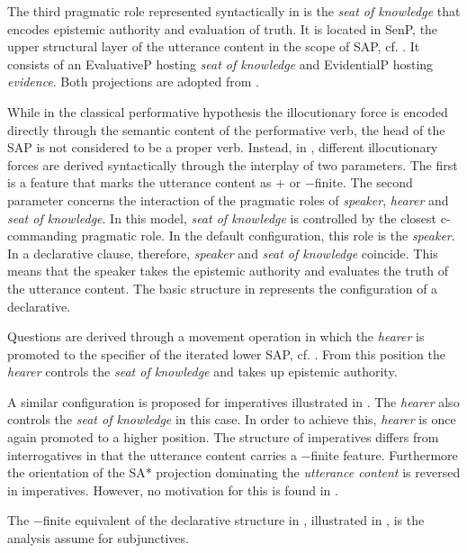 The third pragmatic role represented syntactically in \citet{SpeasTenny2003} is the \emph{seat of knowledge} that encodes epistemic authority and evaluation of truth. It is located in
SenP, the upper structural layer of the utterance content in the scope of
SAP, cf. . It consists of an EvaluativeP hosting \emph{seat of knowledge} and EvidentialP
hosting \emph{evidence}. Both projections are adopted from \citet{Cinque1990}.

While in the classical performative hypothesis the illocutionary force is encoded directly
through the semantic content of the performative verb, the head of the SAP is not
 considered to be a proper verb. Instead, in \citet{SpeasTenny2003}, different illocutionary forces are derived syntactically through the interplay of two parameters. The first is a feature that marks
the utterance content as + or −finite. The second parameter concerns the interaction of the pragmatic roles of \emph{speaker}, \emph{hearer} and  \emph{seat of knowledge}. In this model,  \emph{seat of knowledge} is controlled by the closest c-commanding pragmatic role. In the default configuration, this role is the \emph{speaker}. In a declarative clause, therefore, \emph{speaker} and \emph{seat of knowledge} coincide. This means  that the speaker takes the epistemic
authority and evaluates the truth of the utterance content. The basic structure in 
represents the configuration of a declarative.

Questions are derived through a movement operation in which the \emph{hearer} is promoted to
the specifier of the iterated lower SAP, cf. . From this position the \emph{hearer} controls
the \emph{seat of knowledge} and takes up epistemic authority.

A similar configuration is proposed for imperatives illustrated in . The \emph{hearer} also controls the \emph{seat of knowledge} in this case. In order to achieve this,  \emph{hearer} is once again promoted to a higher
position. The structure of imperatives differs from interrogatives in that the utterance
content carries a −finite feature. Furthermore the orientation of the SA* projection
dominating the \emph{utterance content} is reversed in imperatives. However, no motivation for this  is
found in \citet{SpeasTenny2003}.

The −finite equivalent of the declarative structure in , illustrated in , is
the analysis \citet{SpeasTenny2003} assume for subjunctives.

